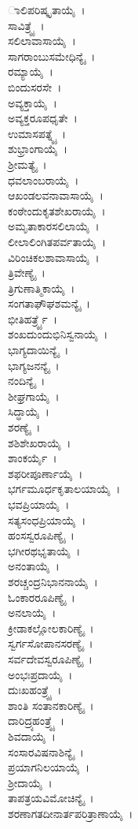 ಾಲಿಪರಿಷ್ಕೃತಾಯೈ~।\\ ಸಾವಿತ್ರ್ಯೈ~।\\ ಸಲಿಲಾವಾಸಾಯೈ~।\\ ಸಾಗರಾಂಬುಸಮೇಧಿನ್ಯೈ~।\\ ರಮ್ಯಾಯೈ~।\\ ಬಿಂದುಸರಸೇ~।\\ ಅವ್ಯಕ್ತಾಯೈ~।\\ ಅವ್ಯಕ್ತರೂಪಧೃತೇ~।\\ ಉಮಾಸಪತ್ನ್ಯೈ~।\\ ಶುಭ್ರಾಂಗಾಯೈ~।\\ ಶ್ರೀಮತ್ಯೈ~।\\ ಧವಲಾಂಬರಾಯೈ~।\\ ಆಖಂಡಲವನಾವಾಸಾಯೈ~।\\ ಕಂಠೇಂದುಕೃತಶೇಖರಾಯೈ~।\\ ಅಮೃತಾಕಾರಸಲಿಲಾಯೈ~।\\ ಲೀಲಾಲಿಂಗಿತಪರ್ವತಾಯೈ~।\\ ವಿರಿಂಚಿಕಲಶಾವಾಸಾಯೈ~।\\ ತ್ರಿವೇಣ್ಯೈ~।\\ ತ್ರಿಗುಣಾತ್ಮಿಕಾಯೈ~।\\ ಸಂಗತಾಘೌಘಶಮನ್ಯೈ~।\\ ಭೀತಿಹರ್ತ್ರ್ಯೈ~।\\ ಶಂಖದುಂದುಭಿನಿಸ್ವನಾಯೈ~।\\ ಭಾಗ್ಯದಾಯಿನ್ಯೈ~।\\ ಭಾಗ್ಯಜನನ್ಯೈ~।\\ ನಂದಿನ್ಯೈ~।\\ ಶೀಘ್ರಗಾಯೈ~।\\ ಸಿದ್ಧಾಯೈ~।\\ ಶರಣ್ಯೈ~।\\ ಶಶಿಶೇಖರಾಯೈ~।\\ ಶಾಂಕರ್ಯೈ~।\\ ಶಫರೀಪೂರ್ಣಾಯೈ~।\\ ಭರ್ಗಮೂರ್ಧಕೃತಾಲಯಾಯೈ~।\\ ಭವಪ್ರಿಯಾಯೈ~।\\ ಸತ್ಯಸಂಧಪ್ರಿಯಾಯೈ~।\\ ಹಂಸಸ್ವರೂಪಿಣ್ಯೈ~।\\ ಭಗೀರಥಭೃತಾಯೈ~।\\ ಅನಂತಾಯೈ~।\\ ಶರಚ್ಚಂದ್ರನಿಭಾನನಾಯೈ~।\\ ಓಂಕಾರರೂಪಿಣ್ಯೈ~।\\ ಅನಲಾಯೈ~।\\ ಕ್ರೀಡಾಕಲ್ಲೋಲಕಾರಿಣ್ಯೈ~।\\ ಸ್ವರ್ಗಸೋಪಾನಸರಣ್ಯೈ~।\\ ಸರ್ವದೇವಸ್ವರೂಪಿಣ್ಯೈ~।\\ ಅಂಭಃಪ್ರದಾಯೈ~।\\ ದುಃಖಹಂತ್ರ್ಯೈ~।\\ ಶಾಂತಿ ಸಂತಾನಕಾರಿಣ್ಯೈ~।\\ ದಾರಿದ್ರ್ಯಹಂತ್ರ್ಯೈ~।\\ ಶಿವದಾಯೈ~।\\ ಸಂಸಾರವಿಷನಾಶಿನ್ಯೈ~।\\ ಪ್ರಯಾಗನಿಲಯಾಯೈ~।\\ ಶ್ರೀದಾಯೈ~।\\ ತಾಪತ್ರಯವಿಮೋಚಿನ್ಯೈ~।\\ ಶರಣಾಗತದೀನಾರ್ತಪರಿತ್ರಾಣಾಯೈ~।\\ 